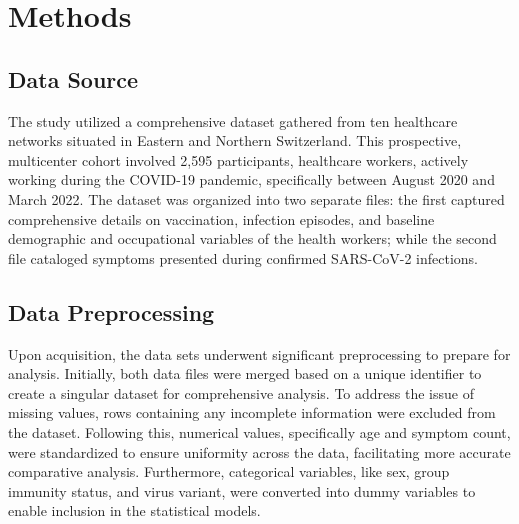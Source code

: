 \documentclass[11pt]{article}
\begin{document}
\section*{Methods}

\subsection*{Data Source}
The study utilized a comprehensive dataset gathered from ten healthcare networks situated in Eastern and Northern Switzerland. This prospective, multicenter cohort involved 2,595 participants, healthcare workers, actively working during the COVID-19 pandemic, specifically between August 2020 and March 2022. The dataset was organized into two separate files: the first captured comprehensive details on vaccination, infection episodes, and baseline demographic and occupational variables of the health workers; while the second file cataloged symptoms presented during confirmed SARS-CoV-2 infections.

\subsection*{Data Preprocessing}
Upon acquisition, the data sets underwent significant preprocessing to prepare for analysis. Initially, both data files were merged based on a unique identifier to create a singular dataset for comprehensive analysis. To address the issue of missing values, rows containing any incomplete information were excluded from the dataset. Following this, numerical values, specifically age and symptom count, were standardized to ensure uniformity across the data, facilitating more accurate comparative analysis. Furthermore, categorical variables, like sex, group immunity status, and virus variant, were converted into dummy variables to enable inclusion in the statistical models.
\end{document}
